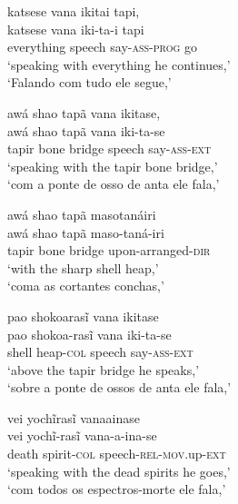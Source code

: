 \documentclass[output=paper,
modfonts,nonflat
]{langsci/langscibook}
\begin{document}
\ea katsese vana ikitai tapi, \\[.3em]
\gll katsese    vana   iki-ta-i              tapi \\
     everything speech say-\textsc{ass-prog} go   \\
\glt `speaking with everything he continues,'\footnotemark \\
`Falando com tudo ele segue,'\\
\z


\newpage 
\ea awá shao tapã vana ikitase, \\[.3em]
\gll awá   shao tapã   vana   iki-ta-se            \\
     tapir bone bridge speech say-\textsc{ass-ext} \\
\glt `speaking with the tapir bone bridge,' \\
`com a ponte de osso de anta ele fala,'\\
\z

\ea awá shao tapã masotanáiri \\[.3em]
\gll awá   shao tapã   maso-taná-iri              \\
     tapir bone bridge upon-arranged-\textsc{dir} \\
\glt `with the sharp shell heap,' \\
\glt `coma as cortantes conchas,' \\
\z

\ea pao shokoarasĩ vana ikitase \\[.3em]
\gll pao   shokoa-rasĩ       vana   iki-ta-se            \\
     shell heap-\textsc{col} speech say-\textsc{ass-ext} \\
\glt `above the tapir bridge he speaks,'\footnotemark \\
\glt `sobre a ponte de ossos de anta ele fala,' \\
\z


\ea vei yochĩrasĩ vanaainase \\[.3em]
\gll vei   yochĩ-rasĩ          vana-a-ina-se                           \\
     death spirit-\textsc{col} speech-\textsc{rel-mov}.up-\textsc{ext} \\
\glt `speaking with the dead spirits he goes,' \\
`com todos os espectros-morte ele fala,' \\
\z
\end{document}
